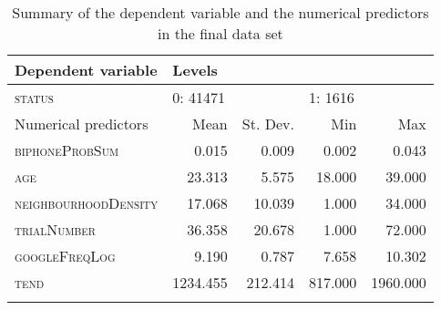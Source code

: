 \begin{table}[H]\fontsize{10}{11}
\caption{Summary of the dependent variable and the numerical predictors in the final data set}
\label{tab:7.5}
\centering
\begin{tabular}{lrrrr} 
\lsptoprule
Dependent variable   & \multicolumn{4}{l}{Levels}                                      \\ 
\midrule
\textsc{status}               & \multicolumn{2}{l}{0:
  41471} & \multicolumn{2}{l}{1:
  1616}  \\ 
\midrule
Numerical predictors & Mean     & St. Dev.            & Min     & Max                  \\ 
\midrule
\textsc{biphoneProbSum}       & 0.015    & 0.009               & 0.002   & 0.043                \\
\textsc{age}                  & 23.313   & 5.575               & 18.000  & 39.000               \\
\textsc{neighbourhoodDensity} & 17.068   & 10.039              & 1.000   & 34.000               \\
\textsc{trialNumber}          & 36.358   & 20.678              & 1.000   & 72.000               \\
\textsc{googleFreqLog}        & 9.190    & 0.787               & 7.658   & 10.302               \\
\textsc{tend}                 & 1234.455 & 212.414             & 817.000 & 1960.000             \\
\lspbottomrule
\end{tabular}
\end{table}





